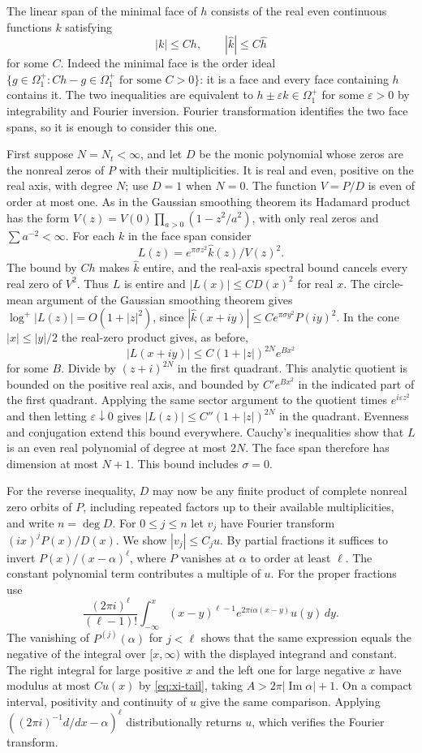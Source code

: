 \documentclass[11pt,a4paper]{article}
\numberwithin{equation}{section}
\begin{document}
The linear span of the minimal face of $h$ consists of the real even
continuous functions $k$ satisfying
\[
 |k|\le C h,\qquad |\widehat k|\le C\widehat h
\]
for some $C$. Indeed the minimal face is the order ideal
$\{g\in\Omega_1^+: C h-g\in\Omega_1^+\text{ for some }C>0\}$:
it is a face and every face containing $h$ contains it. The two
inequalities are equivalent to $h\pm\varepsilon k\in\Omega_1^+$
for some $\varepsilon>0$ by integrability and Fourier inversion.
Fourier transformation identifies the two face spans, so it is enough
to consider this one.

First suppose $N=N_t<\infty$, and let $D$ be the monic polynomial
whose zeros are the nonreal zeros of $P$ with their multiplicities.
It is real and even, positive on the real axis, with degree $N$; use
$D=1$ when $N=0$. The function $V=P/D$ is even of order at most one.
As in the Gaussian smoothing theorem its Hadamard product has the form
$V(z)=V(0)\prod_{a>0}(1-z^2/a^2)$, with only real zeros and
$\sum a^{-2}<\infty$. For each $k$ in the face span consider
\[
 L(z)=e^{\pi\sigma z^2}\widehat k(z)/V(z)^2.
\]
The bound by $Ch$ makes $\widehat k$ entire, and the real-axis spectral
bound cancels every real zero of $V^2$. Thus $L$ is entire and
$|L(x)|\le C D(x)^2$ for real $x$. The circle-mean argument of the
Gaussian smoothing theorem gives
$\log^+|L(z)|=O(1+|z|^2)$, since
$|\widehat k(x+iy)|\le C e^{\pi\sigma y^2}P(iy)^2$.
In the cone $|x|\le |y|/2$ the real-zero product gives, as before,
\[
 |L(x+iy)|\le C(1+|z|)^{2N}e^{B x^2}
\]
for some $B$. Divide by $(z+i)^{2N}$ in the first quadrant. This
analytic quotient is bounded on the positive real axis, and bounded
by $C'e^{B x^2}$ in the indicated part of the first quadrant.
Applying the same sector argument to the quotient times
$e^{i\varepsilon z^2}$ and then letting $\varepsilon\downarrow0$
gives $|L(z)|\le C''(1+|z|)^{2N}$ in the quadrant. Evenness and
conjugation extend this bound everywhere. Cauchy's inequalities show
that $L$ is an even real polynomial of degree at most $2N$. The face
span therefore has dimension at most $N+1$. This bound includes
$\sigma=0$.

For the reverse inequality, $D$ may now be any finite product of
complete nonreal zero orbits of $P$, including repeated factors up
to their available multiplicities, and write $n=\deg D$.
For $0\le j\le n$ let $v_j$ have Fourier transform
$(i x)^jP(x)/D(x)$. We show $|v_j|\le C_j u$. By partial fractions
it suffices to invert $P(x)/(x-\alpha)^\ell$, where $P$ vanishes at
$\alpha$ to order at least $\ell$. The constant polynomial term
contributes a multiple of $u$. For the proper fractions use
\[
 \frac{(2\pi i)^\ell}{(\ell-1)!}
 \int_{-\infty}^x (x-y)^{\ell-1}
             e^{2\pi i\alpha(x-y)}u(y)\,dy .
\]
The vanishing of $P^{(j)}(\alpha)$ for $j<\ell$ shows that the same
expression equals the negative of the integral over $[x,\infty)$
with the displayed integrand and constant. The right integral for
large positive $x$ and the left one for large negative $x$ have
modulus at most $C u(x)$ by \eqref{eq:xi-tail}, taking
$A>2\pi|\operatorname{Im}\alpha|+1$. On a compact interval, positivity
and continuity of $u$ give the same comparison. Applying
$((2\pi i)^{-1}d/dx-\alpha)^\ell$ distributionally returns $u$,
which verifies the Fourier transform.
\end{document}
